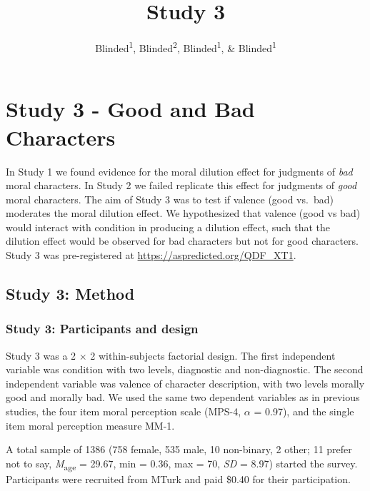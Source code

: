 \documentclass[
  man,floatsintext]{apa7}
\title{Study 3}
\author{Blinded\textsuperscript{1}, Blinded\textsuperscript{2}, Blinded\textsuperscript{1}, \& Blinded\textsuperscript{1}}
\date{}
\affiliation{\vspace{0.5cm}\textsuperscript{1} Blinded\\\textsuperscript{2} Blinded}
\begin{document}
\maketitle

\hypertarget{study-3---good-and-bad-characters}{%
\section{Study 3 - Good and Bad Characters}\label{study-3---good-and-bad-characters}}

In Study 1 we found evidence for the moral dilution effect for judgments of \emph{bad} moral characters. In Study 2 we failed replicate this effect for judgments of \emph{good} moral characters. The aim of Study 3 was to test if valence (good vs.~bad) moderates the moral dilution effect. We hypothesized that valence (good vs bad) would interact with condition in producing a dilution effect, such that the dilution effect would be observed for bad characters but not for good characters. Study 3 was pre-registered at \color{blue}\url{https://aspredicted.org/QDF_XT1}\color{black}.

\hypertarget{study-3-method}{%
\subsection{Study 3: Method}\label{study-3-method}}

\hypertarget{study-3-participants-and-design}{%
\subsubsection{Study 3: Participants and design}\label{study-3-participants-and-design}}

Study 3 was a 2 \(\times\) 2 within-subjects factorial design. The first independent variable was condition with two levels, diagnostic and non-diagnostic. The second independent variable was valence of character description, with two levels morally good and morally bad. We used the same two dependent variables as in previous studies, the four item moral perception scale (MPS-4, \(\alpha\) = 0.97), and the single item moral perception measure MM-1.

A total sample of 1386 (758 female, 535 male, 10 non-binary, 2 other; 11 prefer not to say, \emph{M}\textsubscript{age} = 29.67, min = 0.36, max = 70, \emph{SD} = 8.97) started the survey. Participants were recruited from MTurk and paid \$0.40 for their participation.
\end{document}
